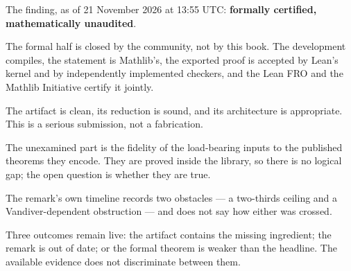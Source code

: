 \begin{keytakeaways}

\item The finding, as of 21 November 2026 at 13:55 UTC: \textbf{formally
certified, mathematically unaudited}.
\item The formal half is closed by the community, not by this book. The
development compiles, the statement is Mathlib's, the exported proof is
accepted by Lean's kernel and by independently implemented checkers, and the
Lean FRO and the Mathlib Initiative certify it jointly.
\item The artifact is clean, its reduction is sound, and its architecture is
appropriate. This is a serious submission, not a fabrication.
\item The unexamined part is the fidelity of the load-bearing inputs to the
published theorems they encode. They are proved inside the library, so there
is no logical gap; the open question is whether they are true.
\item The remark's own timeline records two obstacles --- a two-thirds ceiling
and a Vandiver-dependent obstruction --- and does not say how either was
crossed.
\item Three outcomes remain live: the artifact contains the missing
ingredient; the remark is out of date; or the formal theorem is weaker than
the headline. The available evidence does not discriminate between them.
\end{keytakeaways}
